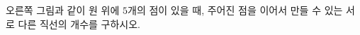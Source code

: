 \hspace*{2mm}\begin{minipage}[t]{\dimexpr\linewidth-2mm\relax}\vspace{0pt}
\noindent\begin{minipage}[t]{0.58\linewidth}\vspace{0pt}\raggedright 오른쪽 그림과 같이 원 위에 $5$개의 점이 있을 때, 주어진 점을 이어서 만들 수 있는 서로 다른 직선의 개수를 구하시오.\end{minipage}\hfill\begin{minipage}[t]{0.4\linewidth}\vspace{0pt}\centering \resizebox{\ifdim\width>\linewidth\linewidth\else\width\fi}{!}{}\end{minipage}\par\end{minipage}

